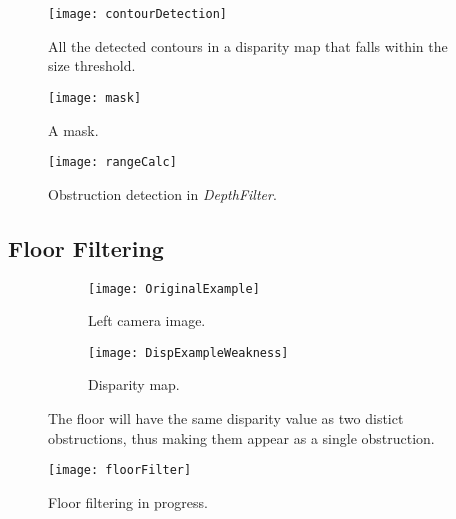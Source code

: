\begin{figure}
	\centering
	\texttt{[image: contourDetection]}
	\caption{All the detected contours in a disparity map that falls within the size threshold.}
	\label{fig:contourDetection}
\end{figure}

\begin{wrapfigure}{r}{0.48\textwidth}
	\vspace{-10pt} %
	\centering
	\texttt{[image: mask]}
	\caption{\label{fig:mask} A mask.}
	\vspace{-20pt} %
\end{wrapfigure}

\begin{figure}
	\centering
	\texttt{[image: rangeCalc]}
	\caption{Obstruction detection in \textit{DepthFilter}.}
	\label{fig:rangeCalc}
\end{figure}

\subsection{Floor Filtering}

\begin{figure}
	\centering
	\begin{subfigure}[b]{0.48\textwidth}
		\texttt{[image: OriginalExample]}
		\caption{Left camera image.}
		\label{fig:OriginalExample2}
	\end{subfigure}
	\begin{subfigure}[b]{0.48\textwidth}
		\texttt{[image: DispExampleWeakness]}
		\caption{Disparity map.}
		\label{fig:DispExampleWeakness}
	\end{subfigure}
	\caption{\label{fig:distanceWeakness}The floor will have the same disparity value as two distict obstructions, thus making them appear as a single obstruction.}
\end{figure}

\begin{figure}
	\centering
	\texttt{[image: floorFilter]}
	\caption{Floor filtering in progress.}
	\label{fig:floorFilter}
\end{figure}

